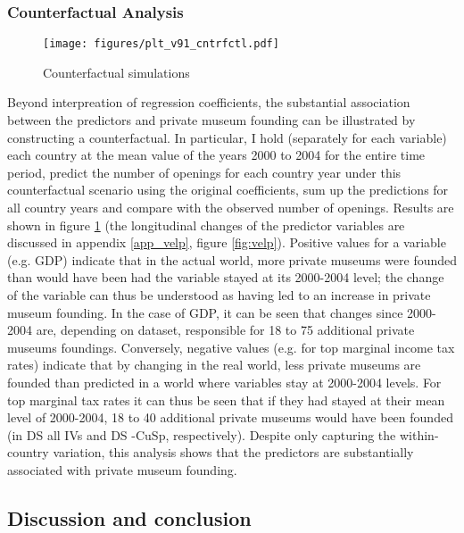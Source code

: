 \documentclass[11pt]{article}
\begin{document}
\subsubsection*{Counterfactual Analysis}

\begin{figure}[htbp]
\centering
\texttt{[image: figures/plt\_v91\_cntrfctl.pdf]}
\caption{\label{fig:cntrfctl}Counterfactual simulations}
\end{figure}

Beyond interpreation of regression coefficients, the substantial association between the predictors and private museum founding can be illustrated by constructing a counterfactual.
In particular, I hold (separately for each variable) each country at the mean value of the years 2000 to 2004 for the entire time period, predict the number of openings for each country year under this counterfactual scenario using the original coefficients, sum up the predictions for all country years and compare with the observed number of openings.
Results are shown in figure \ref{fig:cntrfctl} (the longitudinal changes of the predictor variables are discussed in appendix \ref{app_velp}, figure \ref{fig:velp}).
Positive values for a variable (e.g. GDP) indicate that in the actual world, more private museums were founded than would have been had the variable stayed at its 2000-2004 level; the change of the variable can thus be understood as having led to an increase in private museum founding.
In the case of GDP, it can be seen that changes since 2000-2004 are, depending on dataset, responsible for 18 to 75 additional private museums foundings.
Conversely, negative values (e.g. for top marginal income tax rates) indicate that by changing in the real world, less private museums are founded than predicted in a world where variables stay at 2000-2004 levels.
For top marginal tax rates it can thus be seen that if they had stayed at their mean level of 2000-2004, 18 to 40 additional private museums would have been founded (in DS all IVs and DS -CuSp, respectively).
Despite only capturing the within-country variation, this analysis shows that the predictors are substantially associated with private museum founding. 


\subsection*{Discussion and conclusion}
\end{document}
